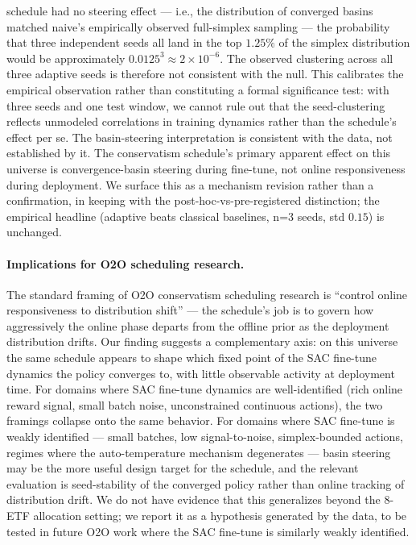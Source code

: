 schedule had no steering effect --- i.e., the distribution of
converged basins matched naive's empirically observed full-simplex
sampling --- the probability that three independent seeds all land in
the top $1.25\%$ of the simplex distribution would be approximately
$0.0125^3 \approx 2 \times 10^{-6}$. The observed clustering across
all three adaptive seeds is therefore not consistent with the null.
This calibrates the empirical observation rather than constituting a
formal significance test: with three seeds and one test window, we
cannot rule out that the seed-clustering reflects unmodeled correlations
in training dynamics rather than the schedule's effect per se. The
basin-steering interpretation is consistent with the data, not
established by it.
The conservatism schedule's primary apparent
effect on this universe is convergence-basin steering during fine-tune,
not online responsiveness during deployment. We surface this as a
mechanism revision rather than a confirmation, in keeping with the
post-hoc-vs-pre-registered distinction; the empirical headline (adaptive
beats classical baselines, n=3 seeds, std $0.15$) is unchanged.

\paragraph{Implications for O2O scheduling research.}
The standard framing of O2O conservatism scheduling research is
``control online responsiveness to distribution shift'' --- the
schedule's job is to govern how aggressively the online phase departs
from the offline prior as the deployment distribution drifts. Our
finding suggests a complementary axis: on this universe the same
schedule appears to shape which fixed point of the SAC fine-tune
dynamics the policy converges to, with little observable activity at
deployment time. For domains where SAC fine-tune dynamics are well-identified
(rich online reward signal, small batch noise, unconstrained continuous
actions), the two framings collapse onto the same behavior. For domains
where SAC fine-tune is weakly identified --- small batches, low
signal-to-noise, simplex-bounded actions, regimes where the
auto-temperature mechanism degenerates --- basin steering may be the
more useful design target for the schedule, and the relevant evaluation
is seed-stability of the converged policy rather than online tracking
of distribution drift. We do not have evidence that this generalizes
beyond the 8-ETF allocation setting; we report it as a hypothesis
generated by the data, to be tested in future O2O work where the
SAC fine-tune is similarly weakly identified.

